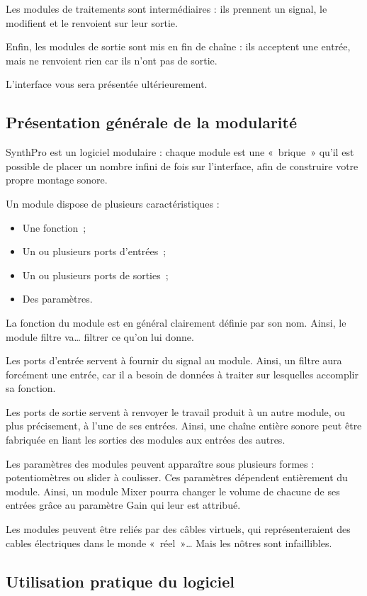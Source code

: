 \documentclass[a4paper,oneside,frenchb,12pt]{article}
\begin{document}
Les modules de traitements sont intermédiaires : ils prennent un signal,
le modifient et le renvoient sur leur sortie.

Enfin, les modules de sortie sont mis en fin de chaîne : ils acceptent
une entrée, mais ne renvoient rien car ils n'ont pas de sortie.

L'interface vous sera présentée ultérieurement.

\subsection{Présentation générale de la modularité}

SynthPro est un logiciel modulaire : chaque module est une «~brique~»
qu'il est possible de placer un nombre infini de fois sur l'interface,
afin de construire votre propre montage sonore.

Un module dispose de plusieurs caractéristiques :

\begin{itemize}
\item
  Une fonction~;
\item
  Un ou plusieurs ports d'entrées~;
\item
  Un ou plusieurs ports de sorties~;
\item
  Des paramètres.
\end{itemize}
La fonction du module est en général clairement définie par son nom.
Ainsi, le module filtre va\ldots{} filtrer ce qu'on lui donne.

Les ports d'entrée servent à fournir du signal au module. Ainsi, un
filtre aura forcément une entrée, car il a besoin de données à traiter
sur lesquelles accomplir sa fonction.

Les ports de sortie servent à renvoyer le travail produit à un autre
module, ou plus précisement, à l'une de ses entrées. Ainsi, une chaîne
entière sonore peut être fabriquée en liant les sorties des modules aux
entrées des autres.

Les paramètres des modules peuvent apparaître sous plusieurs formes :
potentiomètres ou slider à coulisser. Ces paramètres dépendent
entièrement du module. Ainsi, un module Mixer pourra changer le volume
de chacune de ses entrées grâce au paramètre Gain qui leur est attribué.

Les modules peuvent être reliés par des câbles virtuels, qui
représenteraient des cables électriques dans le monde «~réel~»\ldots{}
Mais les nôtres sont infaillibles.

\subsection{Utilisation pratique du logiciel}
\end{document}
